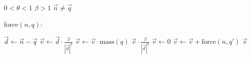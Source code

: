 \begin{algorithmic}
  \REQUIRE \(0 < \theta < 1\)
  \REQUIRE \(\beta > 1\)
  \REQUIRE \(\vec{n} \neq \vec{q}\)
\end{algorithmic}
force\((n, q)\):
\begin{algorithmic}
  \STATE \(\vec{d} \gets \vec{n} - \vec{q}\)
  \STATE \(\vec{v} \gets \vec{d} \cdot \frac{\beta}{|{\vec{d}}|^2}\)
  \STATE \(\vec{v} \gets \vec{v} \cdot \textrm{mass}(q)\)
  \RETURN \(\vec{v} \cdot \frac{\beta}{|{\vec{d}}|^2}\)
  \ELSE
  \STATE \(\vec{v} \gets 0\)
  \STATE \(\vec{v} \gets \vec{v} + \textrm{force}(n, q')\)
  \ENDFOR
  \RETURN \(\vec{v}\)
  \ENDIF
\end{algorithmic}
